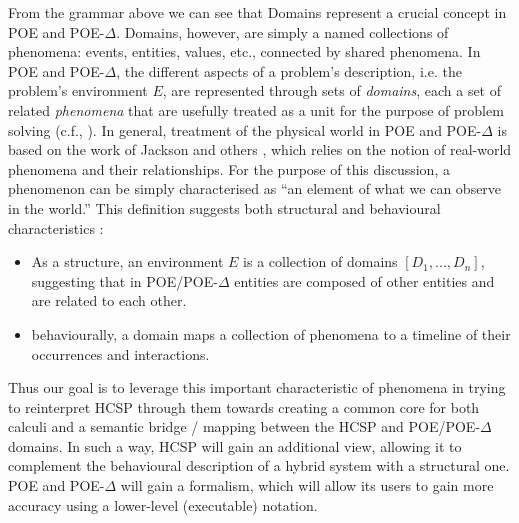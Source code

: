 \documentclass[runningheads,a4paper]{llncs}
\begin{document}
             From the grammar above we can see that Domains represent
             a crucial concept in POE and POE-$\Delta$. Domains,
             however, are simply a named collections of phenomena:
             events, entities, values, etc., connected by shared
             phenomena. In POE and POE-$\Delta$, the different aspects
             of a problem's description, i.e. the problem's
             environment $E$, are represented through sets of
             \textit{domains}, each a set of related
             \textit{phenomena} that are usefully treated as a unit
             for the purpose of problem solving (c.f., \cite[Page
             270]{Jackson2001}). In general, treatment of the physical
             world in POE and POE-$\Delta$ is based on the work of
             Jackson and others
             \cite{896248,Jackson2001,hall2003reference}, which relies
             on the notion of real-world phenomena and their
             relationships. For the purpose of this discussion, a
             phenomenon can be simply characterised as ``an element of
             what we can observe in the world.'' This definition
             suggests both structural and behavioural characteristics
             \cite{hall2003reference}:
             \begin{itemize}
             \item As a structure, an environment $E$ is a collection
               of domains $[D_{1},...,D_{n}]$, suggesting that in
               POE/POE-$\Delta$ entities are composed of other
               entities and are related to each other.
             \item behaviourally, a domain maps a collection of
               phenomena to a timeline of their occurrences and
               interactions.
             \end{itemize}

             Thus our goal is to leverage this important
             characteristic of phenomena in trying to reinterpret HCSP
             through them towards creating a common core for both
             calculi and a semantic bridge / mapping between the HCSP
             and POE/POE-$\Delta$ domains. In such a way, HCSP will
             gain an additional view, allowing it to complement the
             behavioural description of a hybrid system with a
             structural one. POE and POE-$\Delta$ will gain a
             formalism, which will allow its users to gain more
             accuracy using a lower-level (executable) notation.
             
\end{document}
